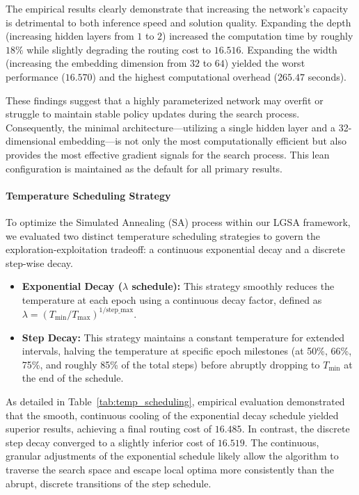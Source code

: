 \documentclass[letterpaper]{article} %
\begin{document}
The empirical results clearly demonstrate that increasing the network's capacity is detrimental to both inference speed and solution quality. Expanding the depth (increasing hidden layers from $1$ to $2$) increased the computation time by roughly $18\%$ while slightly degrading the routing cost to $16.516$. Expanding the width (increasing the embedding dimension from $32$ to $64$) yielded the worst performance ($16.570$) and the highest computational overhead ($265.47$ seconds). 

These findings suggest that a highly parameterized network may overfit or struggle to maintain stable policy updates during the search process. Consequently, the minimal architecture---utilizing a single hidden layer and a 32-dimensional embedding---is not only the most computationally efficient but also provides the most effective gradient signals for the search process. This lean configuration is maintained as the default for all primary results.

\paragraph{Temperature Scheduling Strategy}

To optimize the Simulated Annealing (SA) process within our LGSA framework, we evaluated two distinct temperature scheduling strategies to govern the exploration-exploitation tradeoff: a continuous exponential decay and a discrete step-wise decay. 

\begin{itemize}
    \item \textbf{Exponential Decay ($\lambda$ schedule):} This strategy smoothly reduces the temperature at each epoch using a continuous decay factor, defined as $\lambda = (T_{\min} / T_{\max})^{1/\text{step\_max}}$. 
    \item \textbf{Step Decay:} This strategy maintains a constant temperature for extended intervals, halving the temperature at specific epoch milestones (at 50\%, 66\%, 75\%, and roughly 85\% of the total steps) before abruptly dropping to $T_{\min}$ at the end of the schedule.
\end{itemize}

As detailed in Table~\ref{tab:temp_scheduling}, empirical evaluation demonstrated that the smooth, continuous cooling of the exponential decay schedule yielded superior results, achieving a final routing cost of $16.485$. In contrast, the discrete step decay converged to a slightly inferior cost of $16.519$. The continuous, granular adjustments of the exponential schedule likely allow the algorithm to traverse the search space and escape local optima more consistently than the abrupt, discrete transitions of the step schedule.
\end{document}

